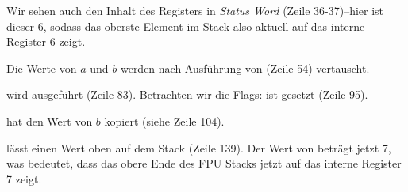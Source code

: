 Wir sehen auch den Inhalt des  Registers in \emph{Status Word} (Zeile
36-37)--hier ist dieser 6, sodass das oberste Element im Stack also aktuell auf das
interne Register 6 zeigt.

Die Werte von $a$ und $b$ werden nach Ausführung von  (Zeile 54)
vertauscht.

 wird ausgeführt (Zeile 83).
Betrachten wir die Flags: \CF ist gesetzt (Zeile 95).

 hat den Wert von $b$ kopiert (siehe Zeile 104).

\FSTP lässt einen Wert oben auf dem Stack (Zeile 139).
Der Wert von  beträgt jetzt 7, was bedeutet, dass das obere Ende des
FPU Stacks jetzt auf das interne Register 7 zeigt.
